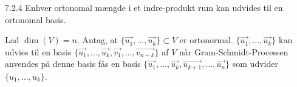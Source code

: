 \begin{korollar}{7.2.4}
	Enhver ortonomal mængde i et indre-produkt rum kan udvides til en ortonomal 
	basis.
\end{korollar}

\begin{bevis}
	Lad $\dim(V) = n$. Antag, at $\{\vec{u_1}, \dotsc, \vec{u_k}\} \subset V$ 
	er ortonormal. $\{\vec{u_1}, \dotsc, \vec{u_k}\}$ kan udvies til en basis
	$\{\vec{u_1}, \dotsc, \vec{u_k}, \vec{v_1}, \dotsc, \vec{v_{n-k}}\}$ af $V$
	når Gram-Schmidt-Processen anvendes på denne basis fås en basis
	$\{\vec{u_1}, \dotsc, \vec{u_k}, \vec{u_{k+1}}, \dotsc, \vec{u_{n}}\}$ som
	udvider $\{u_1, \dotsc, u_k\}$.
\end{bevis}
